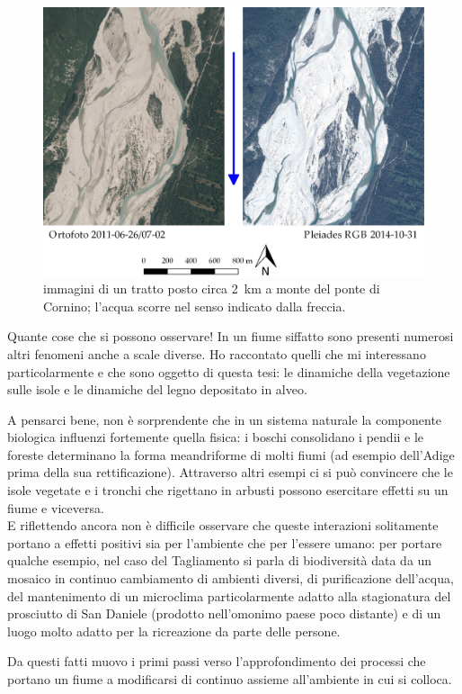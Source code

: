 \begin{figure}
	\centering
	\includegraphics[width=\textwidth]{files/confronto_immagini_erosione_isole.jpeg}
	\caption[immagini di un tratto posto circa \SI{2}{\kilo\m} a monte del ponte di Cornino]{immagini di un tratto posto circa \SI{2}{\kilo\m} a monte del ponte di Cornino; l'acqua scorre nel senso indicato dalla freccia.
	}
	\label{fig:confronto-imm-prefaz}
\end{figure}


Quante cose che si possono osservare! In un fiume siffatto sono presenti numerosi altri fenomeni anche a scale diverse.
Ho raccontato quelli che mi interessano particolarmente e che sono oggetto di questa tesi: le dinamiche della vegetazione sulle isole e le dinamiche del legno depositato in alveo.

\medskip
A pensarci bene, non è sorprendente che in un sistema naturale la componente biologica influenzi fortemente quella fisica: i boschi consolidano i pendii e le foreste determinano la forma meandriforme di molti fiumi (ad esempio dell'Adige prima della sua rettificazione). Attraverso altri esempi ci si può convincere che le isole vegetate e i tronchi che rigettano in arbusti possono esercitare effetti su un fiume e viceversa. 
\\
E riflettendo ancora non è difficile osservare che queste interazioni solitamente portano a effetti positivi sia per l'ambiente che per l'essere umano: per portare qualche esempio, nel caso del Tagliamento si parla di biodiversità data da un mosaico in continuo cambiamento di ambienti diversi, di purificazione dell'acqua, del mantenimento di un microclima particolarmente adatto alla stagionatura del prosciutto di San Daniele (prodotto nell'omonimo paese poco distante) e di un luogo molto adatto per la ricreazione da parte delle persone.

Da questi fatti muovo i primi passi verso l'approfondimento dei processi che portano un fiume a modificarsi di continuo assieme all'ambiente in cui si colloca.

